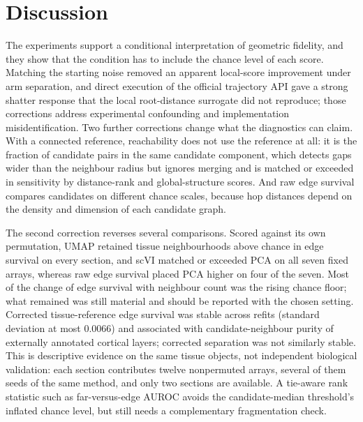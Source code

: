 \documentclass[11pt]{article}
\begin{document}
\begin{table}[!ht]
\centering\small
\caption{Edge survival against the expression PCA. The PCA column is 1 by construction. PBMC has no tissue coordinate. Values are rounded to three decimals.}
\label{tab:expression}

\end{table}

\FloatBarrier

\section{Discussion}

The experiments support a conditional interpretation of geometric fidelity, and they show that the condition has to include the chance level of each score. Matching the starting noise removed an apparent local-score improvement under arm separation, and direct execution of the official trajectory API gave a strong shatter response that the local root-distance surrogate did not reproduce; those corrections address experimental confounding and implementation misidentification. Two further corrections change what the diagnostics can claim. With a connected reference, reachability does not use the reference at all: it is the fraction of candidate pairs in the same candidate component, which detects gaps wider than the neighbour radius but ignores merging and is matched or exceeded in sensitivity by distance-rank and global-structure scores. And raw edge survival compares candidates on different chance scales, because hop distances depend on the density and dimension of each candidate graph.

The second correction reverses several comparisons. Scored against its own permutation, UMAP retained tissue neighbourhoods above chance in edge survival on every section, and scVI matched or exceeded PCA on all seven fixed arrays, whereas raw edge survival placed PCA higher on four of the seven. Most of the change of edge survival with neighbour count was the rising chance floor; what remained was still material and should be reported with the chosen setting. Corrected tissue-reference edge survival was stable across refits (standard deviation at most 0.0066) and associated with candidate-neighbour purity of externally annotated cortical layers; corrected separation was not similarly stable. This is descriptive evidence on the same tissue objects, not independent biological validation: each section contributes twelve nonpermuted arrays, several of them seeds of the same method, and only two sections are available. A tie-aware rank statistic such as far-versus-edge AUROC avoids the candidate-median threshold's inflated chance level, but still needs a complementary fragmentation check.
\end{document}

